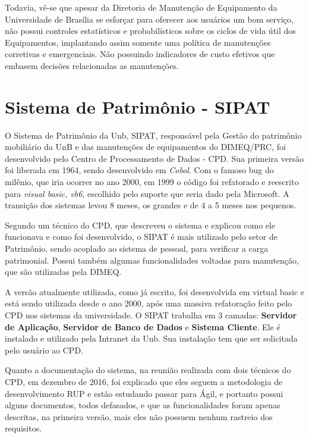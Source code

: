Todavia, vê-se que apesar da Diretoria de Manutenção de Equipamento da Universidade de Brasília se esforçar para oferecer aos usuários um bom serviço, não possui controles estatísticos e probabilísticos sobre os ciclos de vida útil dos Equipamentos, implantando assim somente uma política de manutenções corretivas e emergenciais. Não possuindo indicadores de custo efetivos que embasem decisões relacionadas as manutenções. 


\section{Sistema de Patrimônio - SIPAT}

O Sistema de Patrimônio da Unb, SIPAT, responsável pela Gestão do patrimônio mobiliário da UnB e das manutenções de
equipamentos do DIMEQ/PRC, foi desenvolvido pelo Centro de Processamento de Dados - CPD. Sua primeira versão foi liberada em 1964, sendo desenvolvido em \textit{Cobol}. Com o famoso bug do milênio, que iria ocorrer no ano 2000, em 1999 o código foi refatorado e reescrito para \textit{visual basic, vb6}, escolhido pelo suporte que seria dado pela Microsoft. A transição dos sistemas levou 8 meses, os grandes e de 4 a 5 meses nos pequenos.

Segundo um técnico do CPD, que descreveu o sistema e explicou como ele funcionava e como foi desenvolvido, o SIPAT é mais utilizado pelo setor de Patrimônio, sendo acoplado ao sistema de pessoal, para verificar a carga patrimonial. Possui também algumas funcionalidades voltadas para manutenção, que são utilizadas pela DIMEQ.

A versão atualmente utilizada, como já escrito, foi desenvolvida em virtual basic e está sendo utilizada desde o ano 2000, após uma massiva refatoração feito pelo CPD nos sistemas da universidade. O SIPAT trabalha em 3 camadas: \textbf{Servidor de Aplicação}, \textbf{Servidor de Banco de Dados} e \textbf{Sistema Cliente}. Ele é instalado e utilizado pela Intranet da Unb. Sua instalação tem que ser solicitada pelo usuário ao CPD.

Quanto a documentação do sistema, na reunião realizada com dois técnicos do CPD, em dezembro de 2016, foi explicado que eles seguem a metodologia de desenvolvimento RUP e estão estudando passar para Ágil, e portanto possui alguns documentos, todos defasados, e que as funcionalidades foram apenas descritas, na primeira versão, mais eles não possuem nenhum rastreio dos requisitos.

